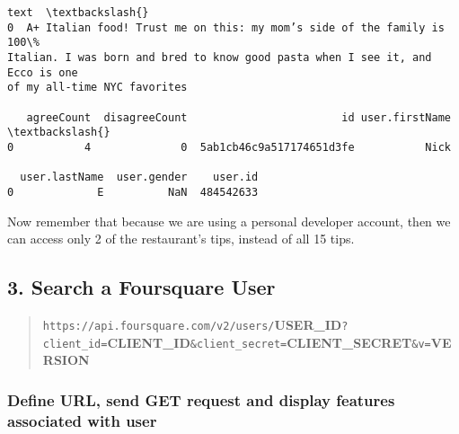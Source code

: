 \documentclass[11pt]{article}
\makeatletter
\newcommand{\boxspacing}{\kern\kvtcb@left@rule\kern\kvtcb@boxsep}
\newcommand{\prompt}[4]{
        \ttfamily\llap{{\color{#2}[#3]:\hspace{3pt}#4}}\vspace{-\baselineskip}
    }
\makeatother
\begin{document}
            \begin{tcolorbox}[breakable, size=fbox, boxrule=.5pt, pad at break*=1mm, opacityfill=0]
\prompt{Out}{outcolor}{30}{\boxspacing}
\begin{Verbatim}[commandchars=\\\{\}]
                 text  \textbackslash{}
0  A+ Italian food! Trust me on this: my mom’s side of the family is 100\%
Italian. I was born and bred to know good pasta when I see it, and Ecco is one
of my all-time NYC favorites

   agreeCount  disagreeCount                        id user.firstName  \textbackslash{}
0           4              0  5ab1cb46c9a517174651d3fe           Nick

  user.lastName  user.gender    user.id
0             E          NaN  484542633
\end{Verbatim}
\end{tcolorbox}
        
    Now remember that because we are using a personal developer account,
then we can access only 2 of the restaurant's tips, instead of all 15
tips.

    

    

    \hypertarget{search-a-foursquare-user}{%
\subsection{3. Search a Foursquare
User}\label{search-a-foursquare-user}}

\begin{quote}
\texttt{https://api.foursquare.com/v2/users/}\textbf{USER\_ID}\texttt{?client\_id=}\textbf{CLIENT\_ID}\texttt{\&client\_secret=}\textbf{CLIENT\_SECRET}\texttt{\&v=}\textbf{VERSION}
\end{quote}

    \hypertarget{define-url-send-get-request-and-display-features-associated-with-user}{%
\subsubsection{Define URL, send GET request and display features
associated with
user}\label{define-url-send-get-request-and-display-features-associated-with-user}}
\end{document}
